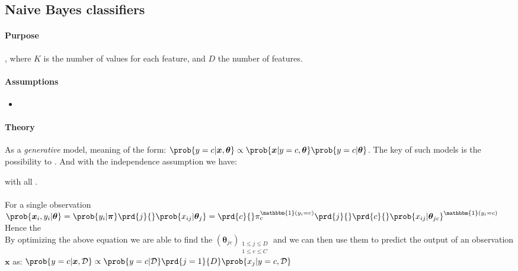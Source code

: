 \subsection{Naive Bayes classifiers}
\paragraph{Purpose}
, where $K$ is the number of values for
each feature, and $D$ the number of features.

\paragraph{Assumptions}
\begin{itemize}
    \item {}
\end{itemize}

\paragraph{Theory}
As a \emph{generative} model, meaning of the form:
$\prob{y=c|\bm{x}, \bm{\theta}} \propto \prob{\bm{x}|y=c,\bm{\theta}}
\prob{y=c|\bm{\theta}}$. The key of such models is the possibility
to . And with the independence assumption we 
have:
\begin{center}
\end{center}
with all .\\
\\
For a single observation
$\prob{\bm{x}_{i}, y_{i}|\bm{\theta}} = \prob{y_{i}|\bm{\pi}}\prd{j}{}\prob{x_{ij}|\bm{\theta}_{j}}= 
\prd{c}{}\pi_{c}^{\mathbbm{1}(y_{i}=c)}\prd{j}{}\prd{c}{}\prob{x_{ij}|
\bm{\theta}_{jc}}^{\mathbbm{1}(y_{i}=c)}
$\\ 
Hence the \\
By optimizing the above equation we are able to find the $\left(\bm{\theta}_{jc}\right)_{\substack{
1\leq j \leq D\\ 1\leq c\leq C}}$ and we can then use them to
predict the output of an observation $\bm{x}$ as: $\prob{y=c|\bm{x},\mathcal{D}} \propto \prob{y=c|\mathcal{D}}\prd{j=1}{D}\prob{x_{j}|y=c,\mathcal{D}}$


